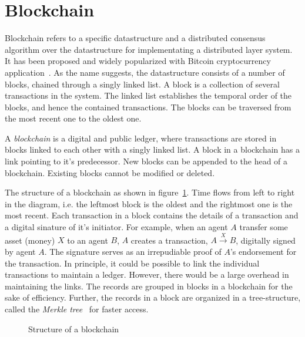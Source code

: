 \section{Blockchain}

Blockchain refers to a specific datastructure and a distributed consensus algorithm over the datastructure for implementating a 
distributed layer system. It has been proposed and widely popularized with Bitcoin cryptocurrency application~\citep{Nakamoto:2008}. 
%
As the name suggests, the datastructure consists of a number of blocks, chained through a singly linked list. A block is a collection 
of several transactions in the system. The linked list establishes the temporal order of the blocks, and hence the contained transactions. 
The blocks can be traversed from the most recent one to the oldest one. 

\begin{definition} [blockchain]
	A {\em blockchain} is a digital and public ledger, where transactions are stored in blocks linked to each other with a
	singly linked list. A block in a blockchain has a link pointing to it's predecessor. New blocks can be appended to the 
	head of a blockchain. Existing blocks cannot be modified or deleted.
\end{definition}

The structure of a blockchain as shown in figure~\ref{fig:ledger:ledger}. Time flows from left to right in the 
diagram, i.e. the leftmost block is the oldest and the rightmost one is the most recent. Each transaction in a block contains the 
details of a transaction and a digital sinature of it's initiator. For example, when an agent $A$ transfer some asset (money) $X$ 
to an agent $B$, $A$ creates a transaction, $A \xrightarrow{X} B$, digitally signed by agent $A$. The signature serves as an 
irrepudiable proof of $A$'s endorsement for the transaction.
%
In principle, it could be possible to link the individual transactions to maintain a ledger. However, there would be a large overhead
in maintaining the links. The records are grouped in blocks in a blockchain for the sake of efficiency. Further, the records in a 
block are organized in a tree-structure, called the {\em Merkle tree}~\citep{Merkle:1989} for faster access.

\begin{figure}[!htbp]
	\centerline{
	}
	\caption{Structure of a blockchain}
	\label{fig:ledger:ledger}
\end{figure}

